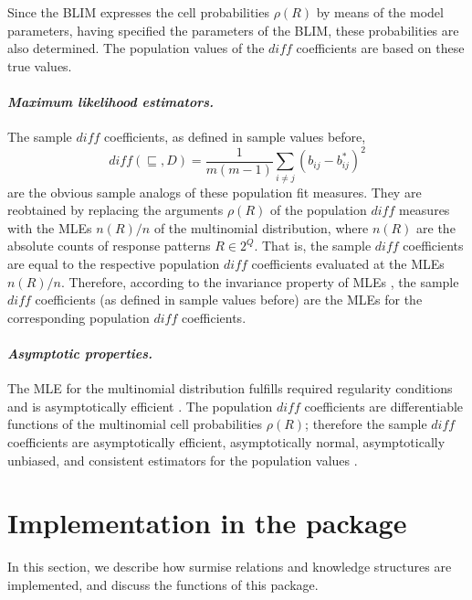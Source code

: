 \documentclass[nojss]{jss}
\begin{document}
Since the BLIM expresses the cell probabilities $\rho(R)$ by means of the model parameters,
having specified the parameters of the BLIM, these probabilities are also determined.
The population values of the $\mathit{diff}$ coefficients are based on these 
true values.

\paragraph{\it Maximum likelihood estimators.}
The sample $\mathit{diff}$ coefficients, as defined in sample values before,
\begin{displaymath}
\mathit{diff} (\sqsubseteq, D) = \frac{1}{m(m-1)}\sum_{i \not= j} (b_{ij} - b^*_{ij})^2
\end{displaymath}
are the obvious sample analogs of these population fit measures. They are reobtained by replacing
the arguments $\rho(R)$ of the population $\mathit{diff}$ measures with the MLEs $n(R)/n$ of the multinomial distribution, where $n(R)$ 
are the absolute counts of response patterns $R\in 2^Q$. That is, the sample $\mathit{diff}$ coefficients are equal to the respective population $\mathit{diff}$ coefficients evaluated at the 
MLEs $n(R)/n$. Therefore, according to the invariance property of MLEs \citep[e.g.,][]{CB:02}, 
the sample $\mathit{diff}$ coefficients (as defined in sample values before) are the MLEs for 
the corresponding population $\mathit{diff}$ coefficients. 

\paragraph{\it Asymptotic properties.}
The MLE for the multinomial distribution fulfills required regularity conditions and 
is asymptotically efficient \citep[e.g.,][]{CB:02}. 
The population $\mathit{diff}$ coefficients are differentiable functions of the multinomial cell probabilities $\rho(R)$; therefore the sample $\mathit{diff}$ coefficients 
are asymptotically efficient, asymptotically normal, asymptotically unbiased, and consistent estimators for the population values \citep[][]{US:10}.

\section[Implementation in the package DAKS]{Implementation in the package }
\label{DAKS}

In this section, we describe how surmise relations and knowledge structures are implemented,  
and discuss the functions of this package. 
\end{document}
